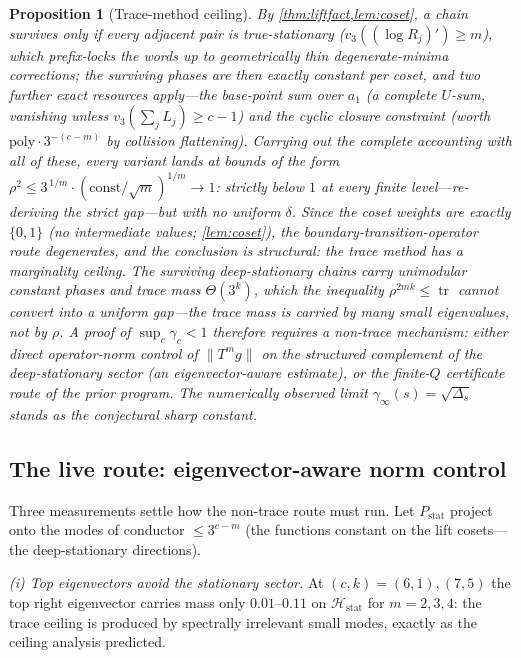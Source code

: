 \documentclass[11pt]{article}
\theoremstyle{plain}
\newtheorem{proposition}{Proposition}
\theoremstyle{definition}
\theoremstyle{remark}
\begin{document}
\begin{proposition}[Trace-method ceiling]\label{rem:sixth}
By \cref{thm:liftfact,lem:coset}, a chain survives only if every adjacent pair
is true-stationary ($v_3((\log R_j)')\ge m$), which prefix-locks the words up
to geometrically thin degenerate-minima corrections; the surviving phases are
then \emph{exactly constant} per coset, and two further exact resources
apply---the base-point sum over $a_1$ (a complete $U$-sum, vanishing unless
$v_3(\sum_jL_j)\ge c-1$) and the cyclic closure constraint (worth
$\mathrm{poly}\cdot3^{-(c-m)}$ by collision flattening). Carrying out the
complete accounting with all of these, every variant lands at bounds of the
form $\rho^2\le3^{\,1/m}\cdot(\text{const}/\sqrt m)^{1/m}\to1$: strictly below
$1$ at every finite level---re-deriving the strict gap---but with no uniform
$\delta$. Since the coset weights are exactly $\{0,1\}$ (no intermediate
values; \cref{lem:coset}), the boundary-transition-operator route degenerates,
and the conclusion is structural: \emph{the trace method has a marginality
ceiling}. The surviving deep-stationary chains carry unimodular constant
phases and trace mass $\Theta(3^k)$, which the inequality
$\rho^{2mk}\le\operatorname{tr}$ cannot convert into a uniform gap---the trace
mass is carried by many small eigenvalues, not by $\rho$. A proof of
$\sup_c\gamma_c<1$ therefore requires a non-trace mechanism: either direct
operator-norm control of $\lVert T^mg\rVert$ on the structured complement of
the deep-stationary sector (an eigenvector-aware estimate), or the finite-$Q$
certificate route of the prior program. The numerically observed limit
$\gamma_\infty(s)=\sqrt{\Delta_s}$ stands as the conjectural sharp constant.
\end{proposition}

\subsection*{The live route: eigenvector-aware norm control}

Three measurements settle how the non-trace route must run. Let
$P_{\mathrm{stat}}$ project onto the modes of conductor $\le3^{c-m}$ (the
functions constant on the lift cosets---the deep-stationary directions).

\emph{(i) Top eigenvectors avoid the stationary sector.} At
$(c,k)=(6,1),(7,5)$ the top right eigenvector carries mass only
$0.01$--$0.11$ on $\mathcal H_{\mathrm{stat}}$ for $m=2,3,4$: the trace
ceiling is produced by spectrally irrelevant small modes, exactly as the
ceiling analysis predicted.
\end{document}
